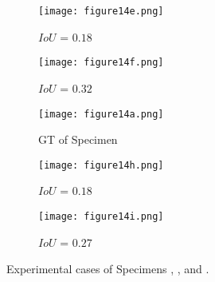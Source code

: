 \begin{figure} [!h]
\begin{subfigure}[b]{0.32\textwidth}
		\centering
		\DIFdelbeginFL %
\DIFdelendFL \DIFaddbeginFL \texttt{[image: figure14e.png]}
		\DIFaddendFL \caption{\(IoU\) = \(0.18\)} 
		\label{fig:L3_S3_B_saeed}
	\end{subfigure}
	\hfill
	\begin{subfigure}[b]{0.32\textwidth}
		\centering
		\DIFdelbeginFL %
\DIFdelendFL \DIFaddbeginFL \texttt{[image: figure14f.png]}
		\DIFaddendFL \caption{\(IoU\) = \(0.32\)} 
		\label{fig:L3_S3_B_ijjeh}
	\end{subfigure}
	\par\medskip
	\begin{subfigure}[b]{0.32\textwidth}
		\centering
		\DIFdelbeginFL %
\DIFdelendFL \DIFaddbeginFL \texttt{[image: figure14a.png]}
		\DIFaddendFL \caption{GT of Specimen~}
		\label{fig:gt_specimen_4}
	\end{subfigure}
	\hfill
	\begin{subfigure}[b]{0.32\textwidth}
		\centering
		\DIFdelbeginFL %
\DIFdelendFL \DIFaddbeginFL \texttt{[image: figure14h.png]}
		\DIFaddendFL \caption{\(IoU\) = \(0.18\)}  
		\label{fig:L3_S4_B_saeed}
	\end{subfigure}
	\hfill
	\begin{subfigure}[b]{0.32\textwidth}
		\centering
		\DIFdelbeginFL %
\DIFdelendFL \DIFaddbeginFL \texttt{[image: figure14i.png]}
		\DIFaddendFL \caption{\(IoU\) = \(0.27\)} 
		\label{fig:L3_S4_B_ijjeh}
	\end{subfigure}
	\caption{Experimental cases of Specimens , , and .}
	\label{fig:exp_case}
\end{figure} 

